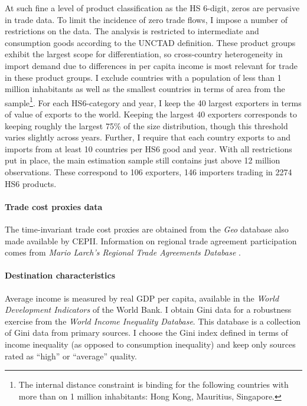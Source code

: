 \documentclass[12pt,a4paper,oneside,times]{article}   	%
\begin{document}
At such fine a level of product classification as the HS 6-digit, zeros are pervasive in trade data. To limit the incidence of zero trade flows, I impose a number of restrictions on the data. The analysis is restricted to intermediate and consumption goods according to the UNCTAD definition. These product groups exhibit the largest scope for differentiation, so cross-country heterogeneity in import demand due to differences in per capita income is most relevant for trade in these product groups. %
I exclude countries with a population of less than 1 million inhabitants as well as  the smallest countries in terms of area from the sample\footnote{The internal distance constraint is binding for the following countries with more than on 1 million inhabitants: Hong Kong, Mauritius, Singapore.}. 
For each HS6-category and year, I keep the 40 largest exporters in terms of value of exports to the world.  Keeping the largest 40 exporters corresponds to keeping roughly the largest 75\% of the size distribution, though this threshold varies slightly across years. Further, I require that each country exports to and imports from at least 10 countries per HS6 good and year. With all restrictions put in place, the main estimation sample still contains just above 12 million observations. These correspond to 106 exporters, 146 importers trading in 2274 HS6 products.


\paragraph{Trade cost proxies data}
The time-invariant trade cost proxies are obtained from the \emph{Geo} database also made available by CEPII. Information on regional trade agreement participation comes from \emph{Mario Larch's Regional Trade Agreements Database} \citep{Egger2008}. 

\paragraph{Destination characteristics}
Average income is measured by real GDP per capita, available in the \emph{World Development Indicators} of the World Bank. I obtain Gini data for a robustness exercise from the \emph{World Income Inequality Database}. This database is a collection of Gini data from primary sources. I choose the Gini index defined in terms of income inequality (as opposed to consumption inequality) and keep only sources rated as ``high'' or ``average'' quality.
\end{document}
